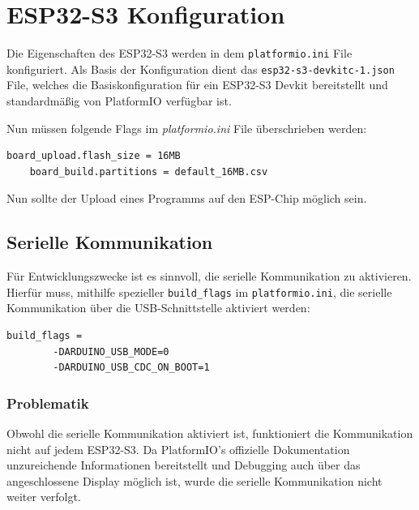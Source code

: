     \section{ESP32-S3 Konfiguration}
    Die Eigenschaften des ESP32-S3 werden in dem \lstinline{platformio.ini}
    File konfiguriert. Als Basis der Konfiguration dient
    das \lstinline{esp32-s3-devkitc-1.json} File, welches die
    Basiskonfiguration für ein ESP32-S3 Devkit bereitstellt
    und standardmäßig von PlatformIO verfügbar ist. \par
    
    Nun müssen folgende Flags im \textit{platformio.ini} File
    überschrieben werden:

    \begin{lstlisting}[style=cppCode]
    board_upload.flash_size = 16MB
    board_build.partitions = default_16MB.csv
    \end{lstlisting}

    Nun sollte der Upload eines Programms auf den 
    ESP-Chip möglich sein.

        \subsection{Serielle Kommunikation}
        Für Entwicklungszwecke ist es sinnvoll, die 
        serielle Kommunikation zu aktivieren. Hierfür
        muss, mithilfe spezieller \texttt{build\_flags}
        im \texttt{platformio.ini}, die serielle Kommunikation über die USB-Schnittstelle
        aktiviert werden:

        \begin{lstlisting}[style=cppCode]
    build_flags =
        -DARDUINO_USB_MODE=0
        -DARDUINO_USB_CDC_ON_BOOT=1
        \end{lstlisting}

            \subsubsection{Problematik}
            Obwohl die serielle Kommunikation aktiviert ist,
            funktioniert die Kommunikation nicht auf jedem
            ESP32-S3. Da PlatformIO's offizielle 
            Dokumentation \cite{PlatformIO_build_flags}
            unzureichende Informationen bereitstellt und
            Debugging auch über das angeschlossene Display
            möglich ist, wurde die serielle Kommunikation
            nicht weiter verfolgt.



    
    
    \newpage
    





